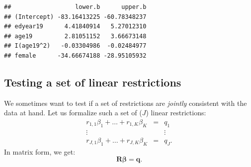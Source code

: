\documentclass[
  12pt,
]{book}
\newenvironment{Shaded}{\begin{snugshade}}{\end{snugshade}}
\newcommand{\AttributeTok}[1]{\textcolor[rgb]{0.77,0.63,0.00}{#1}}
\newcommand{\DecValTok}[1]{\textcolor[rgb]{0.00,0.00,0.81}{#1}}
\newcommand{\FunctionTok}[1]{\textcolor[rgb]{0.00,0.00,0.00}{#1}}
\newcommand{\NormalTok}[1]{#1}
\newcommand{\OtherTok}[1]{\textcolor[rgb]{0.56,0.35,0.01}{#1}}
\newcommand{\SpecialCharTok}[1]{\textcolor[rgb]{0.00,0.00,0.00}{#1}}
\theoremstyle{definition}
\theoremstyle{definition}
\theoremstyle{definition}
\theoremstyle{definition}
\theoremstyle{remark}
\begin{document}
\begin{Shaded}
\end{Shaded}

\begin{verbatim}
##                  lower.b      upper.b
## (Intercept) -83.16413225 -60.78348237
## edyear19      4.41840914   5.27012310
## age19         2.81051152   3.66673148
## I(age19^2)   -0.03304986  -0.02484977
## female      -34.66674188 -28.95105932
\end{verbatim}

\hypertarget{Ftest}{%
\subsection{Testing a set of linear restrictions}\label{Ftest}}

We sometimes want to test if a set of restrictions are \emph{jointly} consistent with the data at hand. Let us formalize such a set of (\(J\)) linear restrictions:
\begin{equation}\label{eq:restrictions}
\begin{array}{ccc}
r_{1,1} \beta_1 + \dots + r_{1,K} \beta_K &=& q_1\\
\vdots && \vdots\\
r_{J,1} \beta_1 + \dots + r_{J,K} \beta_K &=& q_J.
\end{array}
\end{equation}
In matrix form, we get:
\begin{equation}
\mathbf{R}\boldsymbol\beta = \mathbf{q}.
\end{equation}
\end{document}
